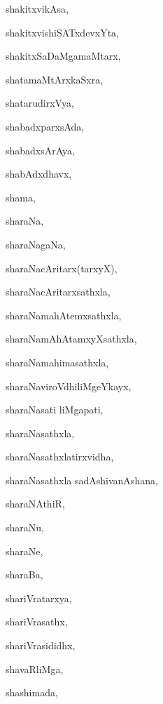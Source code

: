 \begin{multicols}{2}
{shakitxvikAsa}, \pageref{shakitxvikAsa}

{shakitxvishiSATxdevxYta}, \pageref{shakitxvishiSATxdevxYta}

{shakitxSaDaMgamaMtarx}, \pageref{shakitxSaDaMgamaMtarx}

{shatamaMtArxkaSxra}, \pageref{shatamaMtArxkaSxra}

{shatarudirxVya}, \pageref{shatarudirxVya}

{shabadxparxsAda}, \pageref{shabadxparxsAda}

{shabadxsArAya}, \pageref{shabadxsArAya}

{shabAdxdhavx}, \pageref{shabAdxdhavx}

{shama}, \pageref{shama}

{sharaNa}, \pageref{sharaNa}

{sharaNagaNa}, \pageref{sharaNagaNa}

{sharaNacAritarx(tarxyX)}, \pageref{sharaNacAritarxtarxyX}

{sharaNacAritarxsathxla}, \pageref{sharaNacAritarxsathxla}

{sharaNamahAtemxsathxla}, \pageref{sharaNamahAtemxsathxla}

{sharaNamAhAtamxyXsathxla}, \pageref{sharaNamAhAtamxyXsathxla}

{sharaNamahimasathxla}, \pageref{sharaNamahimasathxla}

{sharaNaviroVdhiliMgeYkayx}, \pageref{sharaNaviroVdhiliMgeYkayx}

{sharaNasati liMgapati}, \pageref{sharaNasatiliMgapati}

{sharaNasathxla}, \pageref{sharaNasathxla}

{sharaNasathxlatirxvidha}, \pageref{sharaNasathxlatirxvidha}

{sharaNasathxla sadAshivanAshana}, \pageref{sharaNasathxla sadAshivanAshana}

{sharaNAthiR}, \pageref{sharaNAthiR}

{sharaNu}, \pageref{sharaNu}

{sharaNe}, \pageref{sharaNe}

{sharaBa}, \pageref{sharaBa}

{shariVratarxya}, \pageref{shariVratarxya}

{shariVrasathx}, \pageref{shariVrasathx}

{shariVrasididhx}, \pageref{shariVrasididhx}

{shavaRliMga}, \pageref{shavaRliMga}

{shashimada}, \pageref{shashimada}


\end{multicols}
